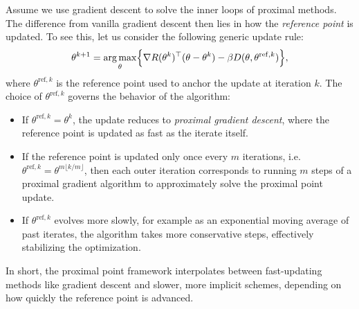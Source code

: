 \documentclass[11pt,letterpaper]{article}
\begin{document}
\begin{remark}
Assume we use gradient descent to solve the inner loops of proximal methods. The difference from vanilla gradient descent then lies in how the \emph{reference point} is updated. To see this, let us consider the following generic update rule:
\[
\theta^{k+1} 
= \operatorname*{arg\,max}_\theta \Bigl\{ \nabla R(\theta^k)^\top (\theta - \theta^k) 
- \beta D(\theta, \theta^{\mathrm{ref},k}) \Bigr\},
\]
where $\theta^{\mathrm{ref},k}$ is the reference point used to anchor the update at iteration $k$.
%
The choice of $\theta^{\mathrm{ref},k}$ governs the behavior of the algorithm:
\begin{itemize}
\item If $\theta^{\mathrm{ref},k} = \theta^k$, the update reduces to \emph{proximal gradient descent}, where the reference point is updated as fast as the iterate itself.  

\item If the reference point is updated only once every $m$ iterations, 
i.e.\ $\theta^{\mathrm{ref},k} = \theta^{m\lfloor k/m \rfloor}$, 
then each outer iteration corresponds to running $m$ steps of a proximal 
gradient algorithm to approximately solve the proximal point update.

\item If $\theta^{\mathrm{ref},k}$ evolves more slowly, for example as an exponential moving average of past iterates, the algorithm takes more conservative steps, effectively stabilizing the optimization. 


\end{itemize}

In short, the proximal point framework interpolates between fast-updating methods like gradient descent and slower, more implicit schemes, depending on how quickly the reference point is advanced.
\end{remark}



\end{document}

